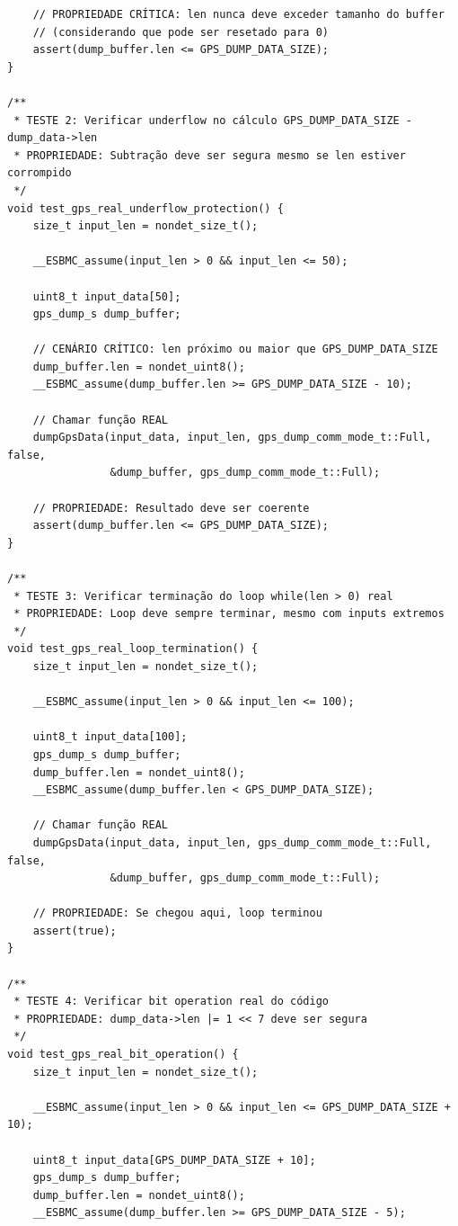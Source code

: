 \begin{lstlisting}
    // PROPRIEDADE CRÍTICA: len nunca deve exceder tamanho do buffer
    // (considerando que pode ser resetado para 0)
    assert(dump_buffer.len <= GPS_DUMP_DATA_SIZE);
}

/**
 * TESTE 2: Verificar underflow no cálculo GPS_DUMP_DATA_SIZE - dump_data->len
 * PROPRIEDADE: Subtração deve ser segura mesmo se len estiver corrompido
 */
void test_gps_real_underflow_protection() {
    size_t input_len = nondet_size_t();
    
    __ESBMC_assume(input_len > 0 && input_len <= 50);
    
    uint8_t input_data[50];
    gps_dump_s dump_buffer;
    
    // CENÁRIO CRÍTICO: len próximo ou maior que GPS_DUMP_DATA_SIZE
    dump_buffer.len = nondet_uint8();
    __ESBMC_assume(dump_buffer.len >= GPS_DUMP_DATA_SIZE - 10);
    
    // Chamar função REAL
    dumpGpsData(input_data, input_len, gps_dump_comm_mode_t::Full, false, 
                &dump_buffer, gps_dump_comm_mode_t::Full);
    
    // PROPRIEDADE: Resultado deve ser coerente
    assert(dump_buffer.len <= GPS_DUMP_DATA_SIZE);
}

/**
 * TESTE 3: Verificar terminação do loop while(len > 0) real
 * PROPRIEDADE: Loop deve sempre terminar, mesmo com inputs extremos
 */
void test_gps_real_loop_termination() {
    size_t input_len = nondet_size_t();
    
    __ESBMC_assume(input_len > 0 && input_len <= 100);
    
    uint8_t input_data[100];
    gps_dump_s dump_buffer;
    dump_buffer.len = nondet_uint8();
    __ESBMC_assume(dump_buffer.len < GPS_DUMP_DATA_SIZE);
    
    // Chamar função REAL
    dumpGpsData(input_data, input_len, gps_dump_comm_mode_t::Full, false, 
                &dump_buffer, gps_dump_comm_mode_t::Full);
    
    // PROPRIEDADE: Se chegou aqui, loop terminou
    assert(true);
}

/**
 * TESTE 4: Verificar bit operation real do código
 * PROPRIEDADE: dump_data->len |= 1 << 7 deve ser segura
 */
void test_gps_real_bit_operation() {
    size_t input_len = nondet_size_t();
    
    __ESBMC_assume(input_len > 0 && input_len <= GPS_DUMP_DATA_SIZE + 10);
    
    uint8_t input_data[GPS_DUMP_DATA_SIZE + 10];
    gps_dump_s dump_buffer;
    dump_buffer.len = nondet_uint8();
    __ESBMC_assume(dump_buffer.len >= GPS_DUMP_DATA_SIZE - 5);
    

\end{lstlisting}
